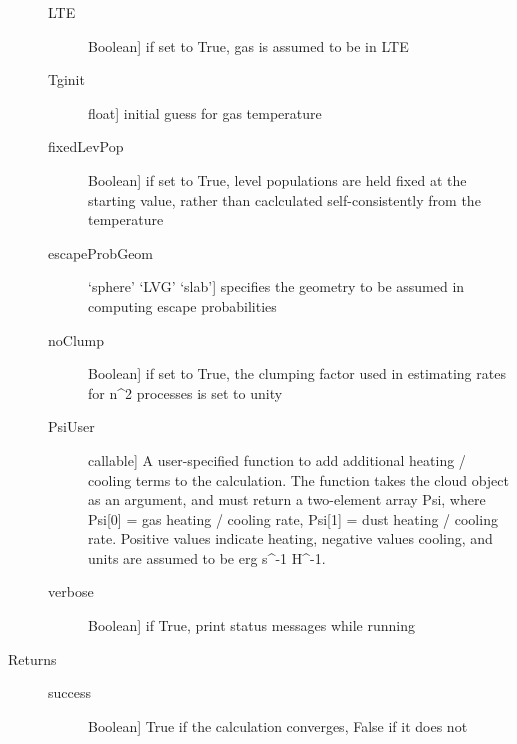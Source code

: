 \documentclass[letterpaper,10pt,english]{sphinxmanual}
\begin{document}
\begin{fulllineitems}
\begin{fulllineitems}
\begin{description}
\begin{description}
\item[{LTE}] \leavevmode{[}Boolean{]}
if set to True, gas is assumed to be in LTE

\item[{Tginit}] \leavevmode{[}float{]}
initial guess for gas temperature

\item[{fixedLevPop}] \leavevmode{[}Boolean{]}
if set to True, level populations are held fixed
at the starting value, rather than caclculated
self-consistently from the temperature

\item[{escapeProbGeom}] \leavevmode{[}`sphere' \textbar{} `LVG' \textbar{} `slab'{]}
specifies the geometry to be assumed in computing escape
probabilities

\item[{noClump}] \leavevmode{[}Boolean{]}
if set to True, the clumping factor used in estimating
rates for n\textasciicircum{}2 processes is set to unity

\item[{PsiUser}] \leavevmode{[}callable{]}
A user-specified function to add additional heating /
cooling terms to the calculation. The function takes the
cloud object as an argument, and must return a two-element
array Psi, where Psi{[}0{]} = gas heating / cooling rate,
Psi{[}1{]} = dust heating / cooling rate. Positive values
indicate heating, negative values cooling, and units are
assumed to be erg s\textasciicircum{}-1 H\textasciicircum{}-1.

\item[{verbose}] \leavevmode{[}Boolean{]}
if True, print status messages while running

\end{description}

\item[{Returns}] \leavevmode\begin{description}
\item[{success}] \leavevmode{[}Boolean{]}
True if the calculation converges, False if it does not

\end{description}

\end{description}

\end{fulllineitems}



\end{fulllineitems}
\end{document}
